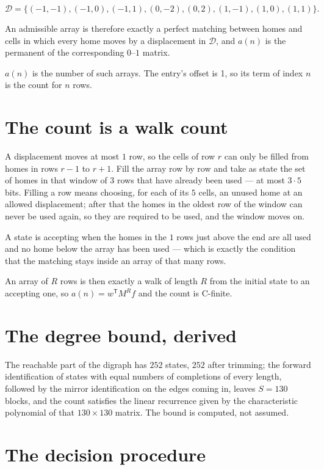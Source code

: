 \documentclass[11pt]{article}
\theoremstyle{definition}
\begin{document}
\[\mathcal{D} = \{(-1,-1), (-1,0), (-1,1), (0,-2), (0,2), (1,-1), (1,0), (1,1)\}.\]

An admissible array is therefore exactly a perfect matching between homes and cells in which every home moves by a displacement in $\mathcal{D}$, and $a(n)$ is the permanent of the corresponding $0$--$1$ matrix.

$a(n)$ is the number of such arrays. The entry's offset is 1, so its term of index $n$ is the count for $n$ rows.

\section{The count is a walk count}

A displacement moves at most $1$ row, so the cells of row $r$ can only be filled from homes in rows $r-1$ to $r+1$. Fill the array row by row and take as state the set of homes in that window of $3$ rows that have already been used --- at most $3\cdot5$ bits. Filling a row means choosing, for each of its $5$ cells, an unused home at an allowed displacement; after that the homes in the oldest row of the window can never be used again, so they are required to be used, and the window moves on.

A state is accepting when the homes in the $1$ rows just above the end are all used and no home below the array has been used --- which is exactly the condition that the matching stays inside an array of that many rows.

An array of $R$ rows is then exactly a walk of length $R$ from the initial state to an accepting one, so $a(n) = w^{\mathsf T}M^{R}f$ and the count is C-finite.

\section{The degree bound, derived}

The reachable part of the digraph has $252$ states, $252$ after trimming; the forward identification of states with equal numbers of completions of every length, followed by the mirror identification on the edges coming in, leaves $S = 130$ blocks, and the count satisfies the linear recurrence given by the characteristic polynomial of that $130\times130$ matrix. The bound is computed, not assumed.

\section{The decision procedure}
\end{document}
